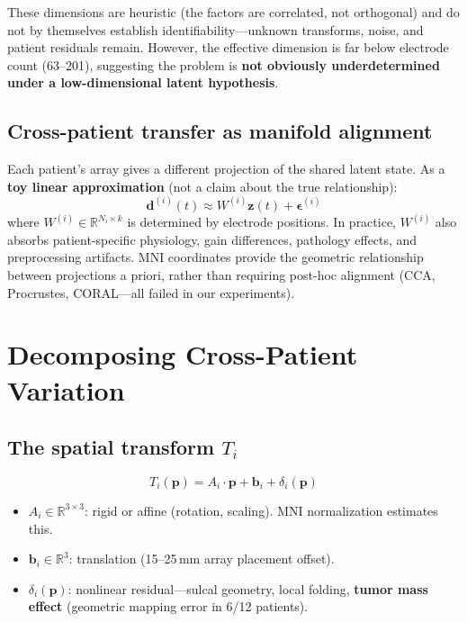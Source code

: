 \documentclass[11pt,letterpaper]{article}
\newcommand{\bfp}{\mathbf{p}}
\newcommand{\bfz}{\mathbf{z}}
\newcommand{\bfd}{\mathbf{d}}
\newcommand{\bfb}{\mathbf{b}}
\newcommand{\R}{\mathbb{R}}
\begin{document}
\noindent These dimensions are heuristic (the factors are correlated, not orthogonal) and do not by themselves establish identifiability---unknown transforms, noise, and patient residuals remain.
However, the effective dimension is far below electrode count (63--201), suggesting the problem is \textbf{not obviously underdetermined under a low-dimensional latent hypothesis}.

\subsection{Cross-patient transfer as manifold alignment}

Each patient's array gives a different projection of the shared latent state. As a \textbf{toy linear approximation} (not a claim about the true relationship):
\begin{equation}
\bfd^{(i)}(t) \approx W^{(i)} \bfz(t) + \boldsymbol{\epsilon}^{(i)}
\end{equation}
where $W^{(i)} \in \R^{N_i \times k}$ is determined by electrode positions. In practice, $W^{(i)}$ also absorbs patient-specific physiology, gain differences, pathology effects, and preprocessing artifacts.
MNI coordinates provide the geometric relationship between projections a priori, rather than requiring post-hoc alignment (CCA, Procrustes, CORAL---all failed in our experiments).


\section{Decomposing Cross-Patient Variation}

\subsection{The spatial transform \texorpdfstring{$T_i$}{Ti}}

\begin{equation}\label{eq:transform}
T_i(\bfp) = A_i \cdot \bfp + \bfb_i + \delta_i(\bfp)
\end{equation}
\begin{itemize}[leftmargin=2em]
\item $A_i \in \R^{3 \times 3}$: rigid or affine (rotation, scaling). MNI normalization estimates this.
\item $\bfb_i \in \R^3$: translation (15--25\,mm array placement offset).
\item $\delta_i(\bfp)$: nonlinear residual---sulcal geometry, local folding, \textbf{tumor mass effect} (geometric mapping error in 6/12 patients).
\end{itemize}
\end{document}
